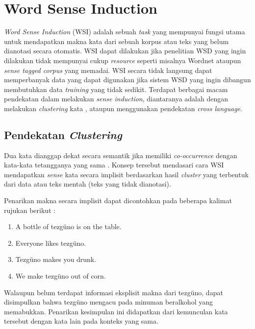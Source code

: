 \section{Word Sense Induction}
\textit{Word Sense Induction} (WSI) adalah sebuah \textit{task} yang mempunyai fungsi utama untuk mendapatkan makna kata dari sebuah korpus atau teks yang belum dianotasi secara otomatis. WSI dapat dilakukan jika penelitian WSD yang ingin dilakukan tidak mempunyai cukup \textit{resource} seperti misalnya Wordnet ataupun \textit{sense tagged corpus} yang memadai. WSI secara tidak langsung dapat memperbanyak data yang dapat digunakan jika sistem WSD yang ingin dibangun membutuhkan data \textit{training} yang tidak sedikit. Terdapat berbagai macam pendekatan dalam melakukan \textit{sense induction}, diantaranya adalah dengan melakukan \textit{clustering} kata \citep{denkowski2009survey}, ataupun menggunakan pendekatan \textit{cross language}.
	
	\subsection{Pendekatan \textit{Clustering}}
	Dua kata dianggap dekat secara semantik jika memiliki \textit{co-occurrence} dengan kata-kata tetangganya yang sama \citep{nasiruddin2013state}. Konsep tersebut mendasari cara WSI mendapatkan \textit{sense} kata secara implisit berdasarkan hasil \textit{cluster} yang terbentuk dari data atau teks mentah (teks yang tidak dianotasi).
	
	Penarikan makna secara implisit dapat dicontohkan pada beberapa kalimat rujukan berikut \citep{denkowski2009survey}:
	
	\begin{enumerate}
		\item A bottle of tezg\"{u}no is on the table.
		\item Everyone likes tezg\"{u}no.
		\item Tezg\"{u}no makes you drunk.
		\item We make tezg\"{u}no out of corn.
	\end{enumerate}
	
	Walaupun belum terdapat informasi eksplisit makna dari tezg\"{u}no, dapat disimpulkan bahwa tezg\"{u}no mengacu pada minuman beralkohol yang memabukkan. Penarikan kesimpulan ini didapatkan dari kemunculan kata tersebut dengan kata lain pada konteks yang sama.
	
